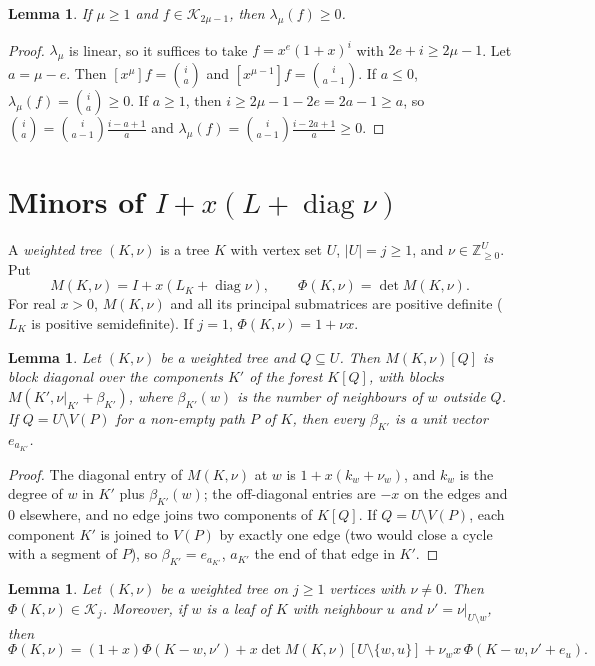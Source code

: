 \documentclass[11pt]{amsart}
\newtheorem{lemma}[theorem]{Lemma}
\theoremstyle{definition}
\theoremstyle{remark}
\newcommand{\diag}{\operatorname{diag}}
\newcommand{\K}{\mathcal K}
\begin{document}
\begin{lemma}\label{lem:A}
If $\mu\ge1$ and $f\in\K_{2\mu-1}$, then $\lambda_\mu(f)\ge0$.
\end{lemma}

\begin{proof}
$\lambda_\mu$ is linear, so it suffices to take $f=x^e(1+x)^i$ with
$2e+i\ge2\mu-1$. Let $a=\mu-e$. Then $[x^\mu]f=\binom ia$ and
$[x^{\mu-1}]f=\binom i{a-1}$. If $a\le0$, $\lambda_\mu(f)=\binom ia\ge0$. If
$a\ge1$, then $i\ge2\mu-1-2e=2a-1\ge a$, so
$\binom ia=\binom i{a-1}\frac{i-a+1}{a}$ and
$\lambda_\mu(f)=\binom i{a-1}\frac{i-2a+1}{a}\ge0$.
\end{proof}

\section{Minors of \texorpdfstring{$I+x(L+\diag\nu)$}{I+x(L+diag nu)}}\label{sec:minors}

A \emph{weighted tree} $(K,\nu)$ is a tree $K$ with vertex set $U$, $|U|=j\ge1$,
and $\nu\in\mathbb Z_{\ge0}^U$. Put
\[
M(K,\nu)=I+x(L_K+\diag\nu),\qquad \Phi(K,\nu)=\det M(K,\nu).
\]
For real $x>0$, $M(K,\nu)$ and all its principal submatrices are positive
definite ($L_K$ is positive semidefinite). If $j=1$, $\Phi(K,\nu)=1+\nu x$.

\begin{lemma}\label{lem:blocks}
Let $(K,\nu)$ be a weighted tree and $Q\subseteq U$. Then $M(K,\nu)[Q]$ is
block diagonal over the components $K'$ of the forest $K[Q]$, with blocks
$M(K',\nu|_{K'}+\beta_{K'})$, where $\beta_{K'}(w)$ is the number of
neighbours of $w$ outside $Q$. If $Q=U\setminus V(P)$ for a non-empty path
$P$ of $K$, then every $\beta_{K'}$ is a unit vector $e_{a_{K'}}$.
\end{lemma}

\begin{proof}
The diagonal entry of $M(K,\nu)$ at $w$ is $1+x(k_w+\nu_w)$, and $k_w$ is the
degree of $w$ in $K'$ plus $\beta_{K'}(w)$; the off-diagonal entries are $-x$
on the edges and $0$ elsewhere, and no edge joins two components of $K[Q]$.
If $Q=U\setminus V(P)$, each component $K'$ is joined to $V(P)$ by exactly one
edge (two would close a cycle with a segment of $P$), so $\beta_{K'}=e_{a_{K'}}$,
$a_{K'}$ the end of that edge in $K'$.
\end{proof}

\begin{lemma}\label{lem:K}
Let $(K,\nu)$ be a weighted tree on $j\ge1$ vertices with $\nu\ne0$. Then
$\Phi(K,\nu)\in\K_j$. Moreover, if $w$ is a leaf of $K$ with neighbour $u$ and
$\nu'=\nu|_{U\setminus w}$, then
\begin{equation}\label{eq:K3}
\Phi(K,\nu)=(1+x)\Phi(K-w,\nu')+x\det M(K,\nu)[U\setminus\{w,u\}]+\nu_wx\,\Phi(K-w,\nu'+e_u).
\end{equation}
\end{lemma}
\end{document}
